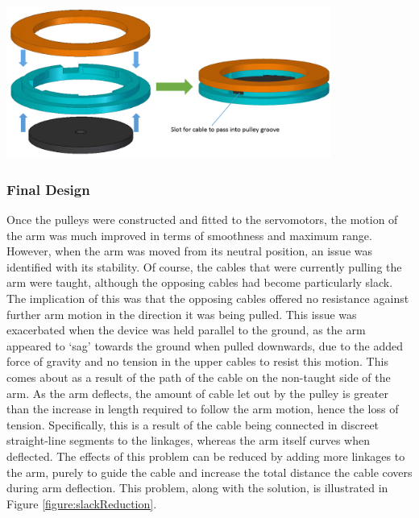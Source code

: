\documentclass[11pt]{article}
\begin{document}
\begin{center}
\includegraphics[width=0.8\textwidth]{images/pulleyDesign.png}
\label{figure:pulleyDesign}
\end{center}



\subsubsection{Final Design}

Once the pulleys were constructed and fitted to the servomotors, the motion of the arm was much improved in terms of smoothness and maximum range. However, when the arm was moved from its neutral position, an issue was identified with its stability. Of course, the cables that were currently pulling the arm were taught, although the opposing cables had become particularly slack. The implication of this was that the opposing cables offered no resistance against further arm motion in the direction it was being pulled. This issue was exacerbated when the device was held parallel to the ground, as the arm appeared to `sag' towards the ground when pulled downwards, due to the added force of gravity and no tension in the upper cables to resist this motion. This comes about as a result of the path of the cable on the non-taught side of the arm. As the arm deflects, the amount of cable let out by the pulley is greater than the increase in length required to follow the arm motion, hence the loss of tension. Specifically, this is a result of the cable being connected in discreet straight-line segments to the linkages, whereas the arm itself curves when deflected. The effects of this problem can be reduced by adding more linkages to the arm, purely to guide the cable and increase the total distance the cable covers during arm deflection. This problem, along with the solution, is illustrated in Figure \ref{figure:slackReduction}.
\end{document}
